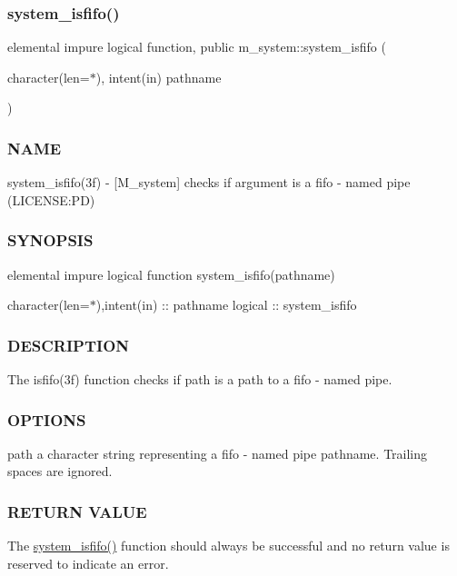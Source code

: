 \subsubsection{\texorpdfstring{system\+\_\+isfifo()}{system\_isfifo()}}
{\footnotesize\ttfamily elemental impure logical function, public m\+\_\+system\+::system\+\_\+isfifo (\begin{DoxyParamCaption}\item[{character(len=$\ast$), intent(in)}]{pathname }\end{DoxyParamCaption})}



\subsubsection*{N\+A\+ME}

system\+\_\+isfifo(3f) -\/ \mbox{[}M\+\_\+system\mbox{]} checks if argument is a fifo -\/ named pipe (L\+I\+C\+E\+N\+SE\+:PD) 

\subsubsection*{S\+Y\+N\+O\+P\+S\+IS}

elemental impure logical function system\+\_\+isfifo(pathname)

character(len=$\ast$),intent(in) \+:\+: pathname logical \+:\+: system\+\_\+isfifo

\subsubsection*{D\+E\+S\+C\+R\+I\+P\+T\+I\+ON}

The isfifo(3f) function checks if path is a path to a fifo -\/ named pipe.

\subsubsection*{O\+P\+T\+I\+O\+NS}

path a character string representing a fifo -\/ named pipe pathname. Trailing spaces are ignored.

\subsubsection*{R\+E\+T\+U\+RN V\+A\+L\+UE}

The \mbox{\hyperlink{namespacem__system_aa2bdb5f75405d87934c10756b539d082}{system\+\_\+isfifo()}} function should always be successful and no return value is reserved to indicate an error.


